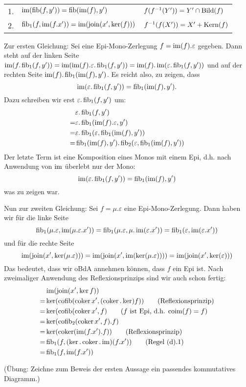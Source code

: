 \begin{lemm}[Regel (e)]
\ \linebreak

\begin{tabular}{rll}
   1.
&  $\operatorname{im}(\operatorname{fib}(f,y')) = \operatorname{fib}(\operatorname{im}(f),y')$
&  $f(f^{-1}(Y')) = Y' \cap \operatorname{Bild}(f)$
\\ 2.
&  $\operatorname{fib}_1(f,\operatorname{im}(f.x')) = \operatorname{im}(\operatorname{join}(x', \ker(f)))$
&  $f^{-1}(f(X')) = X' + \operatorname{Kern}(f)$
\end{tabular}
\end{lemm}
\begin{bew}
Zur ersten Gleichung:
Sei eine Epi-Mono-Zerlegung $f=\operatorname{im}(f).\varepsilon$ gegeben.
Dann steht auf der linken Seite $\operatorname{im}(f.\operatorname{fib}_1(f,y')) = \operatorname{im}(\operatorname{im}(f).\varepsilon.\operatorname{fib}_1(f,y')) = \operatorname{im}(f).\operatorname{im}(\varepsilon.\operatorname{fib}_1(f,y'))$ und auf der rechten Seite $\operatorname{im}(f).\operatorname{fib}_1(\operatorname{im}(f),y')$. Es reicht also, zu zeigen, dass
\[ \operatorname{im}(\varepsilon.\operatorname{fib}_1(f,y')) = \operatorname{fib}_1(\operatorname{im}(f),y'). \]
Dazu schreiben wir erst $\varepsilon.\operatorname{fib}_1(f,y')$ um:
\begin{align*}
&\varepsilon.\operatorname{fib}_1(f,y')
\\=& \varepsilon.\operatorname{fib}_1(\operatorname{im}(f).\varepsilon,y')
\\=& \varepsilon.\operatorname{fib}_1(\varepsilon,\operatorname{fib}_1(\operatorname{im}(f),y'))
\\=& \operatorname{fib}_1(\operatorname{im}(f),y').\operatorname{fib}_2(\varepsilon,\operatorname{fib}_1(\operatorname{im}(f),y'))
\end{align*}
Der letzte Term ist eine Komposition eines Monos mit einem Epi, d.h. nach Anwendung von $\operatorname{im}$ überlebt nur der Mono:
\[ \operatorname{im}(\varepsilon.\operatorname{fib}_1(f,y')) = \operatorname{fib}_1(\operatorname{im}(f),y') \]
was zu zeigen war.

Nun zur zweiten Gleichung:
Sei $f = \mu.\varepsilon$ eine Epi-Mono-Zerlegung. Dann haben wir für die linke Seite
\[ \operatorname{fib}_1(\mu.\varepsilon,\operatorname{im}(\mu.\varepsilon.x')) = \operatorname{fib}_1(\mu.\varepsilon, \mu.\operatorname{im}(\varepsilon.x')) = \operatorname{fib}_1(\varepsilon, \operatorname{im}(\varepsilon.x')) \]
und für die rechte Seite
\[ \operatorname{im}(\operatorname{join}(x',\ker(\mu.\varepsilon))) = \operatorname{im}(\operatorname{join}(x',\operatorname{im}(\ker(\mu.\varepsilon))))
= \operatorname{im}(\operatorname{join}(x',\ker(\varepsilon))) \]
Das bedeutet, dass wir oBdA annehmen können, dass $f$ ein Epi ist.
Nach zweimaliger Anwendung des Reflexionsprinzips sind wir auch schon fertig:
\begin{align*}
   & \operatorname{im}(\operatorname{join}(x',\ker f))
\\=& \ker(\operatorname{cofib}(\operatorname{coker} x', (\operatorname{coker} . \ker) f)) \qquad\text{(Reflexionsprinzip)}
\\=& \ker(\operatorname{cofib}(\operatorname{coker} x', f) \qquad \text{($f$ ist Epi, d.h. $\operatorname{coim}(f) = f$)}
\\=& \ker(\operatorname{cofib}_2(\operatorname{coker} x', f).f)
\\=& \ker(\operatorname{coker}(\operatorname{im}(f.x').f)) \qquad \text{(Reflexionsprinzip)}
\\=& \operatorname{fib}_1(f,(\ker.\operatorname{coker}.\operatorname{im})(f.x')) \qquad \text{(Regel (d).1)}
\\=& \operatorname{fib}_1(f,\operatorname{im}(f.x'))
\end{align*}

 
(Übung: Zeichne zum Beweis der ersten Aussage ein passendes kommutatives Diagramm.)
\end{bew}

